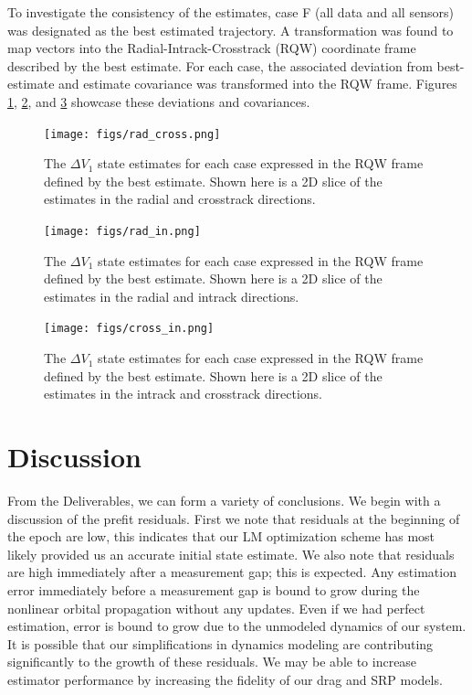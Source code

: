 \documentclass[11pt]{article}
\begin{document}
To investigate the consistency of the estimates, case F (all data and all sensors) was designated as the best estimated trajectory. A transformation was found to map vectors into the Radial-Intrack-Crosstrack (RQW) coordinate frame described by the best estimate. For each case, the associated deviation from best-estimate and estimate covariance was transformed into the RQW frame. Figures \ref{fig:rad_cross}, \ref{fig:rad_in}, and \ref{fig:cross_in} showcase these deviations and covariances.

\begin{figure}[!htb]
	\centering
	\texttt{[image: figs/rad\_cross.png]}
	\caption{The $\Delta V_1$ state estimates for each case expressed in the RQW frame defined by the best estimate. Shown here is a 2D slice of the estimates in the radial and crosstrack directions.}
	\label{fig:rad_cross}
\end{figure}

\begin{figure}[!htb]
	\centering
	\texttt{[image: figs/rad\_in.png]}
	\caption{The $\Delta V_1$ state estimates for each case expressed in the RQW frame defined by the best estimate. Shown here is a 2D slice of the estimates in the radial and intrack directions.}
	\label{fig:rad_in}
\end{figure}

\begin{figure}[!htb]
	\centering
	\texttt{[image: figs/cross\_in.png]}
	\caption{The $\Delta V_1$ state estimates for each case expressed in the RQW frame defined by the best estimate. Shown here is a 2D slice of the estimates in the intrack and crosstrack directions.}
	\label{fig:cross_in}
\end{figure}

 
\section{Discussion}

From the Deliverables, we can form a variety of conclusions. We begin with a discussion of the prefit residuals. First we note that residuals at the beginning of the epoch are low, this indicates that our LM optimization scheme has most likely provided us an accurate initial state estimate. We also note that residuals are high immediately after a measurement gap; this is expected. Any estimation error immediately before a measurement gap is bound to grow during the nonlinear orbital propagation without any updates. Even if we had perfect estimation, error is bound to grow due to the unmodeled dynamics of our system. It is possible that our simplifications in dynamics modeling are contributing significantly to the growth of these residuals. We may be able to increase estimator performance by increasing the fidelity of our drag and SRP models. \\
\end{document}
